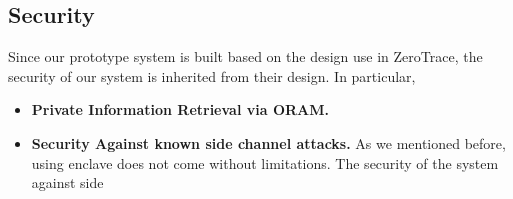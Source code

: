 \subsection{Security}
\begin{newtext}
Since our prototype system is built based on the design use in ZeroTrace, the security of our system is inherited from their design. In particular, 
\begin{itemize}
	\item \textbf{Private Information Retrieval via ORAM. }  

	\item \textbf{Security Against known side channel attacks.} As we mentioned before, using enclave does not come without limitations. The security of the system against side
\end{itemize}
\end{newtext}